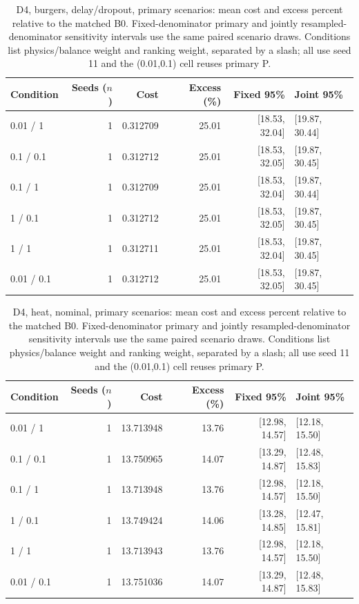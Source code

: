 \begin{table}[ht]
\centering\small
\caption{D4, burgers, delay/dropout, primary scenarios: mean cost and excess percent relative to the matched B0. Fixed-denominator primary and jointly resampled-denominator sensitivity intervals use the same paired scenario draws. Conditions list physics/balance weight and ranking weight, separated by a slash; all use seed 11 and the (0.01,0.1) cell reuses primary P.}\label{tab:revision_cost_E4_burgers_locked_delay_dropout}
\begin{tabular}{@{}lrrrrl@{}}\toprule
Condition & Seeds ($n$) & Cost & Excess (\%) & Fixed 95\% & Joint 95\%\\\midrule
0.01 / 1 & 1 & 0.312709 & 25.01 & [18.53, 32.04] & [19.87, 30.44]\\
0.1 / 0.1 & 1 & 0.312712 & 25.01 & [18.53, 32.05] & [19.87, 30.45]\\
0.1 / 1 & 1 & 0.312709 & 25.01 & [18.53, 32.04] & [19.87, 30.44]\\
1 / 0.1 & 1 & 0.312712 & 25.01 & [18.53, 32.05] & [19.87, 30.45]\\
1 / 1 & 1 & 0.312711 & 25.01 & [18.53, 32.04] & [19.87, 30.45]\\
0.01 / 0.1 & 1 & 0.312712 & 25.01 & [18.53, 32.05] & [19.87, 30.45]\\
\bottomrule\end{tabular}
\end{table}

\begin{table}[ht]
\centering\small
\caption{D4, heat, nominal, primary scenarios: mean cost and excess percent relative to the matched B0. Fixed-denominator primary and jointly resampled-denominator sensitivity intervals use the same paired scenario draws. Conditions list physics/balance weight and ranking weight, separated by a slash; all use seed 11 and the (0.01,0.1) cell reuses primary P.}\label{tab:revision_cost_E4_heat_locked_nominal}
\begin{tabular}{@{}lrrrrl@{}}\toprule
Condition & Seeds ($n$) & Cost & Excess (\%) & Fixed 95\% & Joint 95\%\\\midrule
0.01 / 1 & 1 & 13.713948 & 13.76 & [12.98, 14.57] & [12.18, 15.50]\\
0.1 / 0.1 & 1 & 13.750965 & 14.07 & [13.29, 14.87] & [12.48, 15.83]\\
0.1 / 1 & 1 & 13.713948 & 13.76 & [12.98, 14.57] & [12.18, 15.50]\\
1 / 0.1 & 1 & 13.749424 & 14.06 & [13.28, 14.85] & [12.47, 15.81]\\
1 / 1 & 1 & 13.713943 & 13.76 & [12.98, 14.57] & [12.18, 15.50]\\
0.01 / 0.1 & 1 & 13.751036 & 14.07 & [13.29, 14.87] & [12.48, 15.83]\\
\bottomrule\end{tabular}
\end{table}

